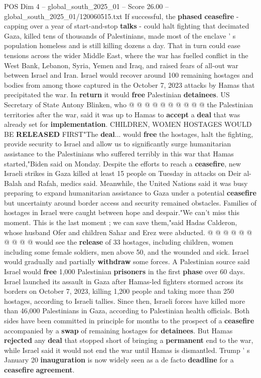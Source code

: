 \begin{textsample}{POS Dim 4 – global\_south\_2025\_01 – Score 26.00 – global\_south\_2025\_01/120060515.txt}
If successful, the \textbf{phased} \textbf{ceasefire} - capping over a year of start-and-stop \textbf{talks} - could halt fighting that decimated Gaza, killed tens of thousands of Palestinians, made most of the enclave ' s population homeless and is still killing dozens a day.
That in turn could ease tensions across the wider Middle East, where the war has fuelled conflict in the West Bank, Lebanon, Syria, Yemen and Iraq, and raised fears of all-out war between Israel and Iran.
Israel would recover around 100 remaining hostages and bodies from among those captured in the October 7, 2023 attacks by Hamas that precipitated the war.
In \textbf{return} it would \textbf{free} Palestinian \textbf{detainees}.
US Secretary of State Antony Blinken, who @ @ @ @ @ @ @ @ @ @ the Palestinian territories after the war, said it was up to Hamas to \textbf{accept} a \textbf{deal} that was already set for \textbf{implementation}.
CHILDREN, WOMEN HOSTAGES WOULD BE \textbf{RELEASED} FIRST"The \textbf{deal}... would \textbf{free} the hostages, halt the fighting, provide security to Israel and allow us to significantly surge humanitarian assistance to the Palestinians who suffered terribly in this war that Hamas started,"Biden said on Monday.
Despite the efforts to reach a \textbf{ceasefire}, new Israeli strikes in Gaza killed at least 15 people on Tuesday in attacks on Deir al-Balah and Rafah, medics said.
Meanwhile, the United Nations said it was busy preparing to expand humanitarian assistance to Gaza under a potential \textbf{ceasefire} but uncertainty around border access and security remained obstacles.
Families of hostages in Israel were caught between hope and despair."We can't miss this moment.
This is the last moment ; we can save them,"said Hadas Calderon, whose husband Ofer and children Sahar and Erez were abducted. @ @ @ @ @ @ @ @ @ @ would see the \textbf{release} of 33 hostages, including children, women including some female soldiers, men above 50, and the wounded and sick.
Israel would gradually and partially \textbf{withdraw} some forces.
A Palestinian source said Israel would \textbf{free} 1,000 Palestinian \textbf{prisoners} in the first \textbf{phase} over 60 days.
Israel launched its assault in Gaza after Hamas-led fighters stormed across its borders on October 7, 2023, killing 1,200 people and taking more than 250 hostages, according to Israeli tallies.
Since then, Israeli forces have killed more than 46,000 Palestinians in Gaza, according to Palestinian health officials.
Both sides have been committed in principle for months to the prospect of a \textbf{ceasefire} accompanied by a \textbf{swap} of remaining hostages for \textbf{detainees}.
But Hamas \textbf{rejected} any \textbf{deal} that stopped short of bringing a \textbf{permanent} end to the war, while Israel said it would not end the war until Hamas is dismantled.
Trump ' s January 20 \textbf{inauguration} is now widely seen as a de facto \textbf{deadline} for a \textbf{ceasefire} \textbf{agreement}.


\end{textsample}
